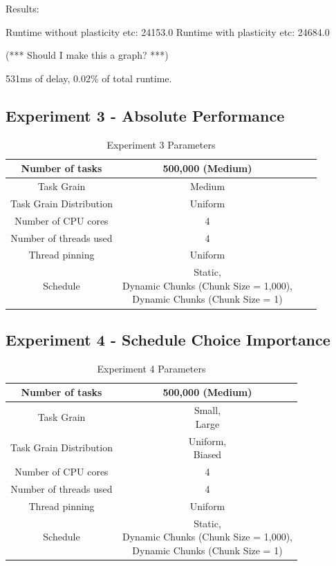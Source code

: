 Results:

Runtime without plasticity etc: 24153.0
Runtime with plasticity etc:    24684.0

(*** Should I make this a graph? ***)

531ms of delay, 0.02\% of total runtime.

\subsection{Experiment 3 - Absolute Performance}

\begin{table}
\centering
	\begin{tabular}{|c|c|c|c|}
		\hline
		Number of tasks & 500,000 (Medium) \\
		\hline
		Task Grain & Medium \\
		\hline
		Task Grain Distribution & Uniform \\
		\hline
		Number of CPU cores & 4 \\
		\hline
		Number of threads used & 4 \\
		\hline
		Thread pinning & Uniform \\
		\hline
		Schedule & \specialcell{Static, \\ Dynamic Chunks (Chunk Size = 1,000), \\ Dynamic Chunks (Chunk Size = 1)} \\
		\hline
	\end{tabular}
\caption{Experiment 3 Parameters}
\label{table:ex3_parameters}
\end{table}




\subsection{Experiment 4 - Schedule Choice Importance}

\begin{table}
\centering
	\begin{tabular}{|c|c|}
		\hline
		Number of tasks & 500,000 (Medium) \\
		\hline
		Task Grain & \specialcell{Small, \\ Large} \\
		\hline
		Task Grain Distribution & \specialcell{Uniform, \\ Biased} \\
		\hline
		Number of CPU cores & 4 \\
		\hline
		Number of threads used & 4 \\
		\hline
		Thread pinning & Uniform \\
		\hline
		Schedule & \specialcell{Static, \\ Dynamic Chunks (Chunk Size = 1,000), \\ Dynamic Chunks (Chunk Size = 1)} \\
		\hline
	\end{tabular}
\caption{Experiment 4 Parameters}
\label{table:ex4_parameters}
\end{table}




